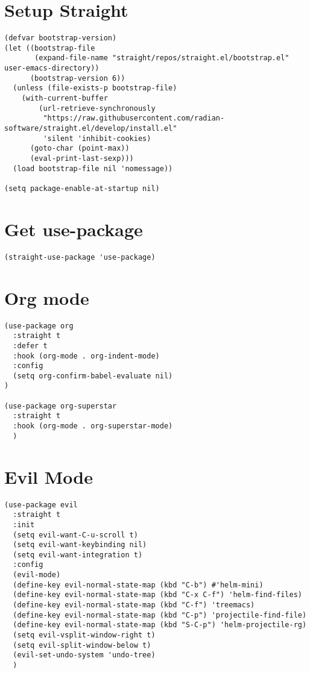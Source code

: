 \documentclass[11pt]{article}
\begin{document}
\section{Setup Straight}
\label{sec:org3166ee5}
\begin{verbatim}
(defvar bootstrap-version)
(let ((bootstrap-file
       (expand-file-name "straight/repos/straight.el/bootstrap.el" user-emacs-directory))
      (bootstrap-version 6))
  (unless (file-exists-p bootstrap-file)
    (with-current-buffer
        (url-retrieve-synchronously
         "https://raw.githubusercontent.com/radian-software/straight.el/develop/install.el"
         'silent 'inhibit-cookies)
      (goto-char (point-max))
      (eval-print-last-sexp)))
  (load bootstrap-file nil 'nomessage))

(setq package-enable-at-startup nil)

\end{verbatim}
\section{Get use-package}
\label{sec:orga4cbb90}
\begin{verbatim}
(straight-use-package 'use-package)
\end{verbatim}
\section{Org mode}
\label{sec:org98aa03e}
\begin{verbatim}
(use-package org
  :straight t
  :defer t
  :hook (org-mode . org-indent-mode)
  :config
  (setq org-confirm-babel-evaluate nil)
)

(use-package org-superstar
  :straight t
  :hook (org-mode . org-superstar-mode)
  )
\end{verbatim}
\section{Evil Mode}
\label{sec:orgc75a009}
\begin{verbatim}
(use-package evil
  :straight t
  :init
  (setq evil-want-C-u-scroll t)
  (setq evil-want-keybinding nil)
  (setq evil-want-integration t)
  :config
  (evil-mode)
  (define-key evil-normal-state-map (kbd "C-b") #'helm-mini)
  (define-key evil-normal-state-map (kbd "C-x C-f") 'helm-find-files)
  (define-key evil-normal-state-map (kbd "C-f") 'treemacs)
  (define-key evil-normal-state-map (kbd "C-p") 'projectile-find-file)
  (define-key evil-normal-state-map (kbd "S-C-p") 'helm-projectile-rg)
  (setq evil-vsplit-window-right t)
  (setq evil-split-window-below t)
  (evil-set-undo-system 'undo-tree)
  )
\end{verbatim}
\end{document}
